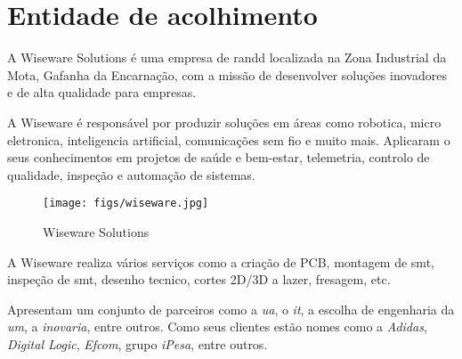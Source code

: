 \chapter{Entidade de acolhimento}%
\label{chapter:entidade}

A Wiseware Solutions é uma empresa de \acs{randd} localizada na Zona Industrial da Mota, Gafanha da Encarnação, com a missão de desenvolver soluções inovadores e de alta qualidade para empresas.

A Wiseware é responsável por produzir soluções em áreas como robotica, micro eletronica, inteligencia artificial, comunicações sem fio e muito mais. Aplicaram o seus conhecimentos em projetos de saúde e bem-estar, telemetria, controlo de qualidade, inspeção e automação de sistemas.

\begin{figure}[h!]
	\centering
    \texttt{[image: figs/wiseware.jpg]}
    \caption[WiseWare Solutions]{Wiseware Solutions}
    \label{fig:company}
\end{figure}

A Wiseware realiza vários serviços como a criação de PCB, montagem de \acs{smt}, inspeção de \acs{smt}, desenho tecnico, cortes 2D/3D a lazer, fresagem, etc.

Apresentam um conjunto de parceiros como a \textit{\ac{ua}}, o \textit{\ac{it}}, a escolha de engenharia da \textit{\ac{um}}, a \textit{inovaria}, entre outros. Como seus clientes estão nomes como a \textit{Adidas}, \textit{Digital Logic}, \textit{Efcom}, grupo \textit{iPesa}, entre outros.
